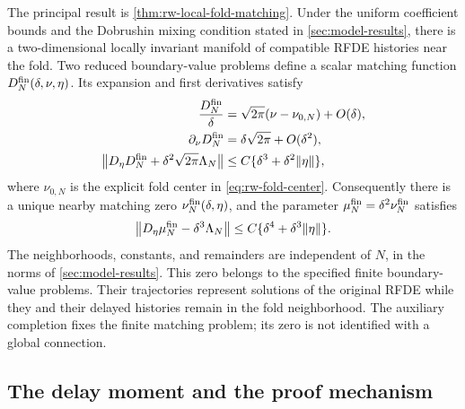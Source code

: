 The principal result is \cref{thm:rw-local-fold-matching}.  Under the uniform
coefficient bounds and the Dobrushin mixing condition stated in
\cref{sec:model-results}, there is a two-dimensional locally invariant
manifold of compatible RFDE histories near the fold.  Two reduced
boundary-value problems define a scalar matching function
\(D_N^{\rm fin}(\delta,\nu,\eta)\).  Its expansion and first derivatives
satisfy
\begin{align}
 \frac{D_N^{\rm fin}}{\delta}
 &=\sqrt{2\pi}(\nu-\nu_{0,N})+O(\delta),\notag\\
 \partial_\nu D_N^{\rm fin}
 &=\delta\sqrt{2\pi}+O(\delta^2),\notag\\
 \bigl\|D_\eta D_N^{\rm fin}
       +\delta^2\sqrt{2\pi}\Lambda_N\bigr\|
 &\le C\{\delta^3+\delta^2\|\eta\|\},              \label{eq:intro-local-matching}
\end{align}
where \(\nu_{0,N}\) is the explicit fold center in \cref{eq:rw-fold-center}.
Consequently there is a unique nearby matching zero
\(\nu_N^{\rm fin}(\delta,\eta)\), and the parameter
\(\mu_N^{\rm fin}=\delta^2\nu_N^{\rm fin}\) satisfies
\begin{equation}
 \bigl\|D_\eta\mu_N^{\rm fin}-\delta^3\Lambda_N\bigr\|
 \le C\{\delta^4+\delta^3\|\eta\|\}.                \label{eq:intro-local-root-derivative}
\end{equation}
The neighborhoods, constants, and remainders are independent of \(N\), in
the norms of \cref{sec:model-results}.  This zero belongs to the specified
finite boundary-value problems.  Their trajectories represent solutions of
the original RFDE while they and their delayed histories remain in the fold
neighborhood.  The auxiliary completion fixes the finite matching problem;
its zero is not identified with a global connection.

\subsection{The delay moment and the proof mechanism}

